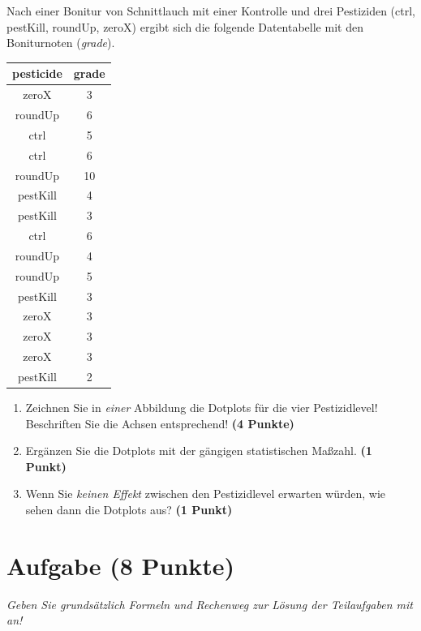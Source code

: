 \documentclass[a4paper, 10pt]{scrartcl}\usepackage[]{graphicx}\usepackage[]{xcolor}
\begin{document}
Nach einer Bonitur von Schnittlauch mit einer Kontrolle und drei Pestiziden (ctrl, pestKill, roundUp, zeroX) ergibt sich die folgende Datentabelle mit den Boniturnoten (\textit{grade}). 

\begin{table}[!h]
\centering
\begin{tabular}{cc}
\toprule
pesticide & grade\\
\midrule
zeroX & 3\\
roundUp & 6\\
ctrl & 5\\
ctrl & 6\\
roundUp & 10\\
\addlinespace
pestKill & 4\\
pestKill & 3\\
ctrl & 6\\
roundUp & 4\\
roundUp & 5\\
\addlinespace
pestKill & 3\\
zeroX & 3\\
zeroX & 3\\
zeroX & 3\\
pestKill & 2\\
\bottomrule
\end{tabular}
\end{table}



\begin{enumerate}
\item Zeichnen Sie in \textit{einer} Abbildung die Dotplots f{\"u}r die
  vier Pestizidlevel! Beschriften Sie die Achsen entsprechend!
  \textbf{(4 Punkte)}
\item Erg{\"a}nzen Sie die Dotplots mit der g{\"a}ngigen
  statistischen Ma{\ss}zahl. \textbf{(1 Punkt)}
\item Wenn Sie \textit{keinen Effekt} zwischen den Pestizidlevel erwarten
  w{\"u}rden, wie sehen dann die Dotplots aus? \textbf{(1 Punkt)}
\end{enumerate} 
\clearpage

\section{Aufgabe \hfill (8 Punkte)}

\textit{Geben Sie grunds{\"a}tzlich Formeln und Rechenweg zur L{\"o}sung der
  Teilaufgaben mit an!} \\[1Ex]
\end{document}
